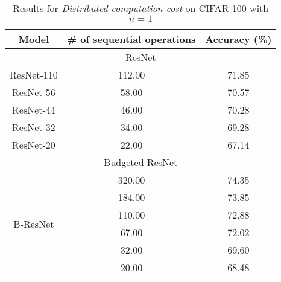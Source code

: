 \begin{table}[h]
\centering
\begin{tabular}{|c||cc|}
\hline
Model                         & \# of sequential operations & Accuracy (\%) \\ \hline \hline
\multicolumn{3}{|c|}{ResNet\cite{DBLP:journals/corr/HeZRS15}}               \\ \hline
ResNet-110                    & 112.00                      & 71.85         \\
ResNet-56                     & 58.00                       & 70.57         \\
ResNet-44                     & 46.00                       & 70.28         \\
ResNet-32                     & 34.00                       & 69.28         \\
ResNet-20                     & 22.00                       & 67.14         \\ \hline \hline
\multicolumn{3}{|c|}{Budgeted ResNet}             \\ \hline
\multirow{6}{*}{B-ResNet} & 320.00                      & 74.35         \\
                              & 184.00                      & 73.85         \\
                              & 110.00                      & 72.88         \\
                              & 67.00                       & 72.02         \\
                              & 32.00                       & 69.60         \\
                              & 20.00                       & 68.48         \\ \hline 
\end{tabular}
\caption{Results for \textit{Distributed computation cost} on CIFAR-100 with $n=1$}
\label{cif100_resnetfab_para1}
\end{table}